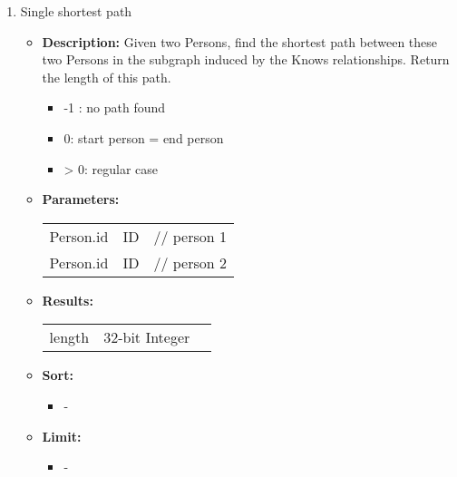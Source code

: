 {\begin{enumerate}
    \item Single shortest path
        \begin{itemize}
            \item \textbf{Description:}
                Given two Persons, find the shortest path between these two Persons in the subgraph induced by the Knows relationships.
                Return the length of this path. 
                \begin{itemize}
                    \item -1 : no path found
                    \item 0: start person = end person
                    \item > 0: regular case
                \end{itemize}
            \item \textbf{Parameters:} \\
                \begin{tabular}{lll}
                    Person.id 	 			& ID & \parbox[t]{20cm}{// person 1\strut} \\
                    Person.id 	 			& ID & \parbox[t]{20cm}{// person 2\strut} \\
                \end{tabular}		
            \item \textbf{Results:} \\
                \begin{tabular}{lll}
                    length 	 			& 32-bit Integer & \parbox[t]{20cm}{\par \strut} \\
                \end{tabular}		
            \item \textbf{Sort:}
                  \begin{itemize}
                    \item[] - 
                  \end{itemize}
            \item \textbf{Limit:}
                  \begin{itemize}
                    \item[] - 
                  \end{itemize}
        \end{itemize}


\end{enumerate}}
